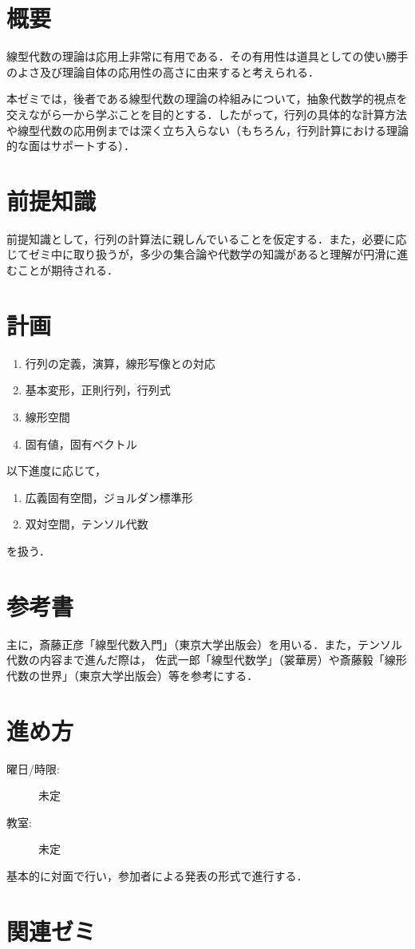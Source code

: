 \documentclass{ltjsarticle}
\begin{document}
  \maketitle
    \section{概要}
    線型代数の理論は応用上非常に有用である．その有用性は道具としての使い勝手のよさ及び理論自体の応用性の高さに由来すると考えられる．

    本ゼミでは，後者である線型代数の理論の枠組みについて，抽象代数学的視点を交えながら一から学ぶことを目的とする．したがって，行列の具体的な計算方法や線型代数の応用例までは深く立ち入らない（もちろん，行列計算における理論的な面はサポートする）．

    \section{前提知識}
    前提知識として，行列の計算法に親しんでいることを仮定する．また，必要に応じてゼミ中に取り扱うが，多少の集合論や代数学の知識があると理解が円滑に進むことが期待される．

    \section{計画}
      \begin{enumerate}
        \item 行列の定義，演算，線形写像との対応
        \item 基本変形，正則行列，行列式
        \item 線形空間
        \item 固有値，固有ベクトル
      \end{enumerate}
      以下進度に応じて，
      \begin{enumerate}[start=5]
        \item 広義固有空間，ジョルダン標準形
        \item 双対空間，テンソル代数
      \end{enumerate}
      を扱う．

    \section{参考書}
    主に，斎藤正彦「線型代数入門」（東京大学出版会）を用いる．また，テンソル代数の内容まで進んだ際は，
    佐武一郎「線型代数学」（裳華房）や斎藤毅「線形代数の世界」（東京大学出版会）等を参考にする．

    \section{進め方}
      \begin{center}
        \begin{description}
        \item[曜日/時限: ] 未定
        \item[教室: ] 未定
      \end{description}
    \end{center}
      基本的に対面で行い，参加者による発表の形式で進行する．

    \section{関連ゼミ}
\end{document}
